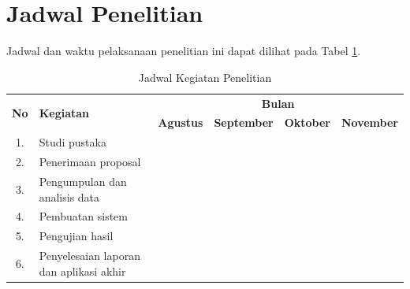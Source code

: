 \section{Jadwal Penelitian}
Jadwal dan waktu pelaksanaan penelitian ini dapat dilihat pada Tabel \ref{tab:jadwal-penelitian}. 

\begin{table}[htbp]
    \centering
    \setlength{\tabcolsep}{4pt}
    \renewcommand{\arraystretch}{1.2}
    \caption{Jadwal Kegiatan Penelitian}
    \label{tab:jadwal-penelitian}
    \begin{tabular}{|c|p{4cm}|c|c|c|c|}
    \hline
    \multirow{2}{*}{\textbf{No}} & \multirow{2}{*}{\textbf{Kegiatan}} & \multicolumn{4}{c|}{\textbf{Bulan}} \\
    \cline{3-6}
     & & \textbf{Agustus} & \textbf{September} & \textbf{Oktober} & \textbf{November} \\
    \hline
    1. & Studi pustaka & \cellcolor{lightgray} & & & \\
    \hline
    2. & Penerimaan proposal & \cellcolor{lightgray} & \cellcolor{lightgray} & & \\
    \hline
    3. & Pengumpulan dan analisis data & \cellcolor{lightgray} & \cellcolor{lightgray} & & \\
    \hline
    4. & Pembuatan sistem & & \cellcolor{lightgray} & \cellcolor{lightgray} & \\
    \hline
    5. & Pengujian hasil & & & \cellcolor{lightgray} & \\
    \hline
    6. & Penyelesaian laporan dan aplikasi akhir & & & \cellcolor{lightgray} & \cellcolor{lightgray} \\
    \hline
    \end{tabular}
\end{table}


